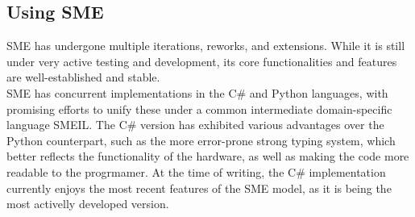\subsection{Using SME}
SME has undergone multiple iterations, reworks, and extensions. While it is still
under very active testing and development, its core functionalities and features
 are well-established and stable\cite{bus_centric_sme}.\\
SME has concurrent implementations in the C\# and Python languages, with promising
efforts to unify these under a common intermediate domain-specific language 
SMEIL\cite{smeil}. The C\# version has exhibited various advantages over the 
Python counterpart, such as the more error-prone strong typing system, which 
better reflects the functionality of the hardware, as well as making the code
more readable to the progrmamer. At the time of writing, the C\# implementation currently
enjoys the most recent features of the SME model, as it is being the most activelly 
developed version. 

